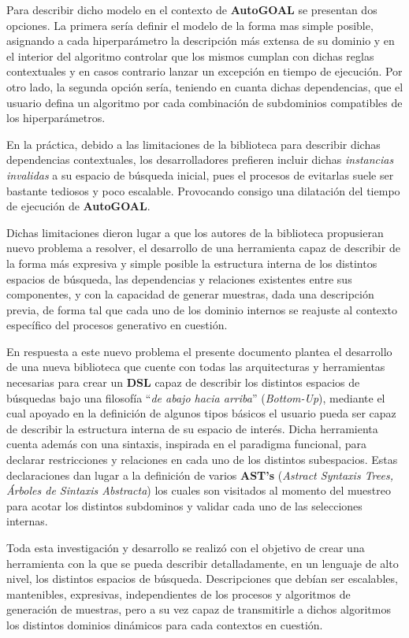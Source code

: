 Para describir dicho modelo en el contexto de {\bf AutoGOAL} se presentan dos opciones.
La primera sería definir el modelo de la forma mas simple posible, asignando a cada
hiperparámetro la descripción más extensa de su dominio y en el interior del algoritmo
controlar que los mismos cumplan con dichas reglas contextuales y en casos contrario
lanzar un excepción en tiempo de ejecución. Por otro lado, la segunda opción sería, teniendo
en cuanta dichas dependencias, que el usuario defina un algoritmo por cada combinación de
subdominios compatibles de los hiperparámetros.

En la práctica, debido a las limitaciones de la biblioteca para describir dichas
dependencias contextuales, los desarrolladores prefieren incluir dichas {\it instancias
        invalidas} a su espacio de búsqueda inicial, pues el procesos de evitarlas suele
ser bastante tediosos y poco escalable. Provocando consigo una dilatación del
tiempo de ejecución de {\bf AutoGOAL}.

Dichas limitaciones dieron lugar a que los autores de la biblioteca propusieran
nuevo problema a resolver, el desarrollo de una herramienta capaz de describir de
la forma más expresiva y simple posible la estructura interna de los
distintos espacios de búsqueda, las dependencias y relaciones existentes entre sus
componentes, y con la capacidad de generar muestras, dada una descripción
previa, de forma tal que cada uno de los dominio internos se reajuste al contexto
específico del procesos generativo en cuestión.

En respuesta a este nuevo problema el presente documento plantea el desarrollo de una
nueva biblioteca que cuente con todas las arquitecturas y herramientas necesarias para
crear un {\bf DSL} capaz de describir los distintos espacios de búsquedas bajo una
filosofía ``{\it de abajo hacia arriba}'' ({\it Bottom-Up}), mediante el cual apoyado
en la definición de algunos tipos básicos el usuario pueda ser capaz de describir la
estructura interna de su espacio de interés. Dicha herramienta cuenta además con una
sintaxis, inspirada en el paradigma funcional, para declarar restricciones y
relaciones en cada uno de los distintos subespacios. Estas declaraciones dan lugar a la
definición de varios {\bf AST's} ({\it Astract Syntaxis Trees, Árboles de Sintaxis
        Abstracta}) los cuales son visitados al momento del muestreo para acotar los distintos
subdominos y validar cada uno de las selecciones internas.

Toda esta investigación y desarrollo se realizó con el objetivo de crear una
herramienta con la que se pueda describir detalladamente, en un lenguaje de alto nivel,
los distintos espacios de búsqueda. Descripciones que debían ser escalables, mantenibles,
expresivas, independientes de los procesos y algoritmos de generación de muestras, pero a
su vez capaz de transmitirle a dichos algoritmos los distintos dominios dinámicos para
cada contextos en cuestión.


